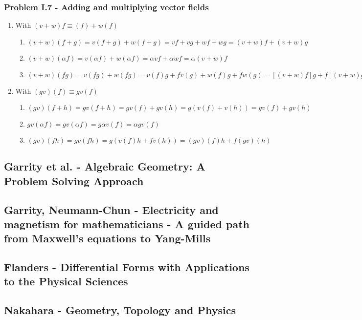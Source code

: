 \documentclass[10pt,a4paper]{book}
\theoremstyle{definition}
\begin{document}
\subsubsection{Problem I.7 - Adding and multiplying vector fields}
\begin{enumerate}
    \item With $(v+w)f\equiv(f)+w(f)$
    \begin{enumerate}
        \item $(v+w)(f+g)=v(f+g)+w(f+g)=vf+vg+wf+wg=(v+w)f+(v+w)g$
        \item $(v+w)(\alpha f)=v(\alpha f)+w(\alpha f)=\alpha v f+\alpha w f=\alpha(v+w)f$
        \item $(v+w)(fg)=v(fg)+w(fg)=v(f)g+fv(g)+w(f)g+fw(g)=[(v+w)f]g+f[(v+w)g]$
    \end{enumerate}
    \item With $(gv)(f)\equiv gv(f)$
    \begin{enumerate}
        \item $(gv)(f+h)=gv(f+h)=gv(f)+gv(h)=g(v(f)+v(h))=gv(f)+gv(h)$
        \item $gv(\alpha f)=gv(\alpha f)=g\alpha v(f)=\alpha gv(f)$
        \item $(gv)(fh)=gv(fh)=g(v(f)h+fv(h))=(gv)(f)h+f(gv)(h)$
    \end{enumerate}
\end{enumerate}

\subsection{{\sc Garrity} et al. - Algebraic Geometry: A Problem Solving Approach}

\subsection{{\sc Garrity, Neumann-Chun} - Electricity and magnetism for mathematicians - A guided path from Maxwell's equations to Yang-Mills}

\subsection{{\sc Flanders} - Differential Forms with Applications to the Physical Sciences}

\subsection{{\sc Nakahara} - Geometry, Topology and Physics}
\end{document}
